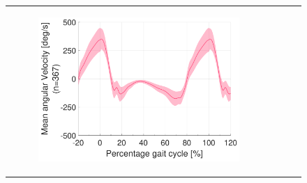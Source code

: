 \begin{figure}[p]
\begin{tabular}{lccc}
        \begin{subfigure}[b]{0.275\textwidth}\includegraphics[width=\linewidth]{content/6-Amputee/Gait-Trends/ch6_amputee_gait_trends_r_ankle_gyro_z_activity_walking.pdf}\end{subfigure}                                                                                                                                                                                                                                                                                                                                          \\


\end{tabular}
\end{figure}
